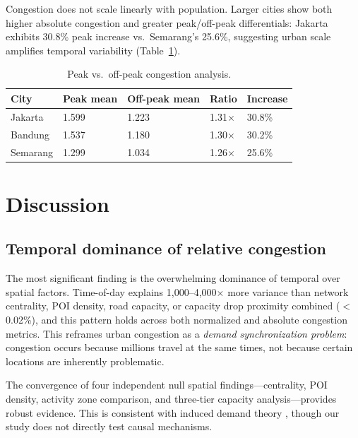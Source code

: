 \documentclass[preprint,12pt,authoryear]{elsarticle}
\begin{document}
Congestion does not scale linearly with population. Larger cities show both higher absolute congestion and greater peak/off-peak differentials: Jakarta exhibits 30.8\% peak increase vs.\ Semarang's 25.6\%, suggesting urban scale amplifies temporal variability (Table~\ref{tab:scaling}).

\begin{table}[htbp]
\centering
\caption{Peak vs.\ off-peak congestion analysis.}
\label{tab:scaling}
\begin{tabular}{lllll}
\toprule
City & Peak mean & Off-peak mean & Ratio & Increase \\
\midrule
Jakarta  & 1.599 & 1.223 & 1.31$\times$ & 30.8\% \\
Bandung  & 1.537 & 1.180 & 1.30$\times$ & 30.2\% \\
Semarang & 1.299 & 1.034 & 1.26$\times$ & 25.6\% \\
\bottomrule
\end{tabular}
\end{table}


\section{Discussion}
\label{sec:discussion}

\subsection{Temporal dominance of relative congestion}

The most significant finding is the overwhelming dominance of temporal over spatial factors. Time-of-day explains 1,000--4,000$\times$ more variance than network centrality, POI density, road capacity, or capacity drop proximity combined ($<$0.02\%), and this pattern holds across both normalized and absolute congestion metrics. This reframes urban congestion as a \emph{demand synchronization problem}: congestion occurs because millions travel at the same times, not because certain locations are inherently problematic.

The convergence of four independent null spatial findings---centrality, POI density, activity zone comparison, and three-tier capacity analysis---provides robust evidence. This is consistent with induced demand theory \citep{Duranton2011}, though our study does not directly test causal mechanisms.
\end{document}
